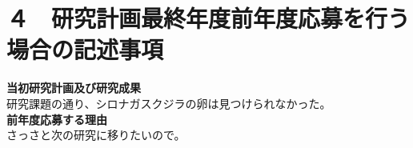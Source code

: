 \documentclass[11pt,a4j,dvipdfmx]{jarticle} 					%
\newcommand{\研究課題名}{象の卵}
\newcommand{\研究機関名}{逢坂大学}
\newcommand{\研究代表者氏名}{湯川秀樹}
\newcommand{\研究期間の最終元号年度}{8}  %
\begin{document}
        \nolinenumbers




\section{４　研究計画最終年度前年度応募を行う場合の記述事項}

\newcommand{\最終年度研究種目名}{基盤研究（Z）}
\newcommand{\最終年度研究課題番号}{99999}
\newcommand{\最終年度研究課題名}{シロナガスクジラの卵はなぜ見つけられないのか}
\newcommand{\最終年度研究期間}{平成25年度〜令和\一年目 年度}


\noindent
\textbf{当初研究計画及び研究成果}\\
	研究課題の通り、シロナガスクジラの卵は見つけられなかった。
\\

\noindent
\textbf{前年度応募する理由}\\
	さっさと次の研究に移りたいので。



\end{document}
